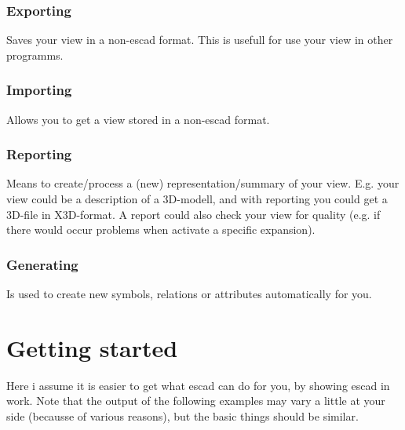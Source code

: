 \documentclass[a4paper, 12pt, openany]{scrbook}
\begin{document}
\subsection{Exporting}
Saves your view in a non-escad format. This is usefull for use your view in other programms.
\subsection{Importing}
Allows you to get a view stored in a non-escad format.
\subsection{Reporting}
Means to create/process a (new) representation/summary of your view. E.g. your view could be a description of a 3D-modell, and with reporting you could get a 3D-file in X3D-format. A report could also check your view for quality (e.g. if there would occur problems when activate a specific expansion).
\subsection{Generating}
Is used to create new symbols, relations or attributes automatically for you. 
\chapter{Getting started}\label{cha:gettingstarted}
Here i assume it is easier to get what escad can do for you, by showing escad in work. Note that the output of the following examples may vary a little at your side (becausse of various reasons), but the basic things should be similar.
\end{document}

